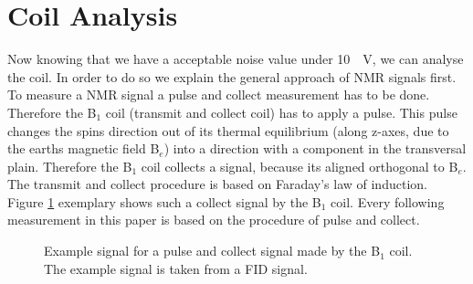 \section{Coil Analysis}
\label{sec:CoilAnalyssis}
Now knowing that we have a acceptable noise value under \SI{10}{\mu \volt}, we can analyse the coil. In order to do so we explain the general approach of NMR signals first. To measure a NMR signal a pulse and collect measurement has to be done. Therefore the B$_1$ coil (transmit and collect coil) has to apply a pulse. This pulse changes the spins direction out of its thermal equilibrium (along z-axes, due to the earths magnetic field B$_e$) into a direction with a component in the transversal plain. Therefore the B$_1$ coil collects a signal, because its aligned orthogonal to B$_e$. The transmit and collect procedure is based on Faraday's law of induction. Figure \ref{fig: PulsandcollectValesignal} exemplary shows such a collect signal by the B$_1$ coil. Every following measurement in this paper is based on the procedure of pulse and collect.

\begin{figure}[H]
    \centering
    
    \caption[Example signal for a pulse and collect signal made by the B$_1$ coil.]{Example signal for a pulse and collect signal made by the B$_1$ coil. The example signal is taken from a FID signal.}
    \label{fig: PulsandcollectValesignal}
\end{figure}

